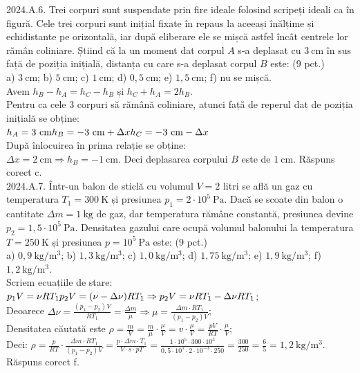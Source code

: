 2024.A.6. Trei corpuri sunt suspendate prin fire ideale folosind scripeți ideali ca în figură. Cele trei corpuri sunt inițial fixate în repaus la aceeași înălțime și echidistante pe orizontală, iar după eliberare ele se mișcă astfel încât centrele lor rămân coliniare. Știind că la un moment dat corpul $A$ s-a deplasat cu $3 \mathrm{~cm}$ în sus față de poziția inițială, distanța cu care s-a deplasat corpul $B$ este: (9 pct.)\\ a) $3 \mathrm{~cm}$; b) $5 \mathrm{~cm}$; c) $1 \mathrm{~cm}$; d) $0,5 \mathrm{~cm}$; e) $1,5 \mathrm{~cm}$; f) nu se mișcă.\\ Avem $h_{B}-h_{A}=h_{C}-h_{B}$ și $h_{C}+h_{A}=2 h_{B}$.\\ Pentru ca cele 3 corpuri să rămână coliniare, atunci față de reperul dat de poziția inițială se obține:\\ $h_{A}=3 \mathrm{~cm} \\ h_{B}=-3 \mathrm{~cm}+\Delta x \\ h_{C}=-3 \mathrm{~cm}-\Delta x$\\ După înlocuirea în prima relație se obține:\\ $\Delta x=2 \mathrm{~cm} \Rightarrow h_{B}=-1 \mathrm{~cm}$. Deci deplasarea corpului $B$ este de $1 \mathrm{~cm}$. Răspuns corect c.\\

2024.A.7. Într-un balon de sticlă cu volumul $V=2$ litri se află un gaz cu temperatura $T_{1}=300 \mathrm{~K}$ și presiunea $p_{1}=2 \cdot 10^{5} \mathrm{~Pa}$. Dacă se scoate din balon o cantitate $\Delta {m}=1 \mathrm{~kg}$ de gaz, dar temperatura rămâne constantă, presiunea devine $p_{2}=1,5 \cdot 10^{5} \mathrm{~Pa}$. Densitatea gazului care ocupă volumul balonului la temperatura $T=250 \mathrm{~K}$ și presiunea $p=10^{5} \mathrm{~Pa}$ este: (9 pct.)\\ a) $0,9 \mathrm{~kg} / \mathrm{m}^{3}$; b) $1,3 \mathrm{~kg} / \mathrm{m}^{3}$; c) $1,0 \mathrm{~kg} / \mathrm{m}^{3}$; d) $1,75 \mathrm{~kg} / \mathrm{m}^{3}$; e) $1,9 \mathrm{~kg} / \mathrm{m}^{3}$; f) $1,2 \mathrm{~kg} / \mathrm{m}^{3}$.\\ Scriem ecuațiile de stare:\\ $p_{1} V=\nu R T_{1} \\ p_{2} V=(\nu-\Delta \nu) R T_{1} \Rightarrow p_{2} V=\nu R T_{1}-\Delta \nu R T_{1}$;\\ Deoarece $\Delta \nu=\frac{\left(p_{1}-p_{2}\right) V}{R T_{1}}=\frac{\Delta m}{\mu} \Rightarrow \mu=\frac{\Delta m \cdot R T_{1}}{\left(p_{1}-p_{2}\right) V}$;\\ Densitatea căutată este $\rho=\frac{m}{V}=\frac{m}{\mu} \cdot \frac{\mu}{V}=v \cdot \frac{\mu}{V}=\frac{p V}{R T} \cdot \frac{\mu}{V}$;\\ Deci: $\rho=\frac{p}{R T} \cdot \frac{\Delta m \cdot R T_{1}}{\left(p_{1}-p_{2}\right) V}=\frac{p \cdot \Delta m \cdot T_{1}}{V \cdot s \cdot p T}=\frac{1 \cdot 10^{5} \cdot 300 \cdot 10^{3}}{0,5 \cdot 10^{5} \cdot 2 \cdot 10^{-3} \cdot 250}=\frac{300}{250}=\frac{6}{5}=1,2 \mathrm{~kg} / \mathrm{m}^{3}$. Răspuns corect f.\\

